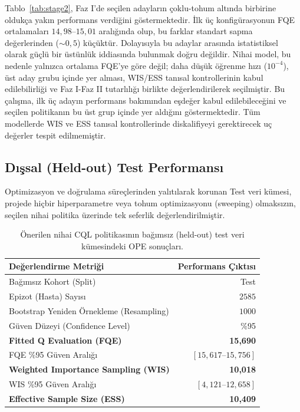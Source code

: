 \documentclass[11pt,a4paper]{article}
\begin{document}
Tablo~\ref{tab:stage2}, Faz I'de seçilen adayların çoklu-tohum altında birbirine oldukça yakın performans verdiğini göstermektedir. İlk üç konfigürasyonun FQE ortalamaları $14{,}98$--$15{,}01$ aralığında olup, bu farklar standart sapma değerlerinden ($\sim 0{,}5$) küçüktür. Dolayısıyla bu adaylar arasında istatistiksel olarak güçlü bir üstünlük iddiasında bulunmak doğru değildir. Nihai model, bu nedenle yalnızca ortalama FQE'ye göre değil; daha düşük öğrenme hızı ($10^{-4}$), üst aday grubu içinde yer alması, WIS/ESS tanısal kontrollerinin kabul edilebilirliği ve Faz I-Faz II tutarlılığı birlikte değerlendirilerek seçilmiştir. Bu çalışma, ilk üç adayın performans bakımından eşdeğer kabul edilebileceğini ve seçilen politikanın bu üst grup içinde yer aldığını göstermektedir. Tüm modellerde WIS ve ESS tanısal kontrollerinde diskalifiyeyi gerektirecek uç değerler tespit edilmemiştir.

\subsection{Dışsal (Held-out) Test Performansı}
Optimizasyon ve doğrulama süreçlerinden yalıtılarak korunan Test veri kümesi, projede hiçbir hiperparametre veya tohum optimizasyonu (sweeping) olmaksızın, seçilen nihai politika üzerinde tek seferlik değerlendirilmiştir.

\begin{table}[H]
\centering
\caption{Önerilen nihai CQL politikasının bağımsız (held-out) test veri kümesindeki OPE sonuçları.}
\label{tab:test}
\begin{tabular}{lr}
\toprule
Değerlendirme Metriği & Performans Çıktısı \\
\midrule
Bağımsız Kohort (Split) & Test \\
Epizot (Hasta) Sayısı & $2585$ \\
Bootstrap Yeniden Örnekleme (Resampling) & $1000$ \\
Güven Düzeyi (Confidence Level) & \%95 \\
\midrule
\textbf{Fitted Q Evaluation (FQE)} & \textbf{15,690} \\
FQE \%95 Güven Aralığı & $[15{,}617\text{--}15{,}756]$ \\
\textbf{Weighted Importance Sampling (WIS)} & \textbf{10,018} \\
WIS \%95 Güven Aralığı & $[4{,}121\text{--}12{,}658]$ \\
\textbf{Effective Sample Size (ESS)} & \textbf{10,409} \\
\bottomrule
\end{tabular}
\end{table}
\end{document}
